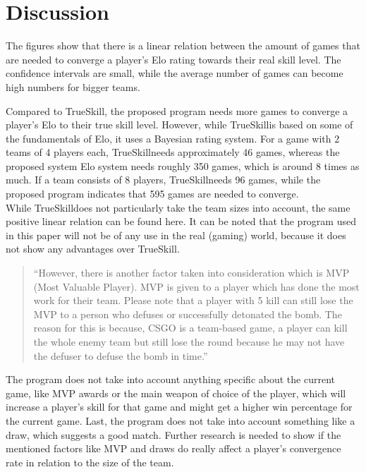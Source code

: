 \documentclass[12pt]{article}
\begin{document}
\section{Discussion}
The figures show that there is a linear relation between the amount of games that are needed to converge a player's Elo rating towards their real skill level. The confidence intervals are small, while the average number of games can become high numbers for bigger teams. 

Compared to TrueSkill\texttrademark, the proposed program needs more games to converge a player's Elo to their true skill level. However, while TrueSkill\texttrademark is based on some of the fundamentals of Elo, it uses a Bayesian rating system.\cite{trueskill} For a game with 2 teams of 4 players each, TrueSkill\texttrademark needs approximately 46 games\cite{trueskillconvergence}, whereas the proposed system Elo system needs roughly 350 games, which is around 8 times as much. If a team consists of 8 players, TrueSkill\texttrademark needs 96 games, while the proposed program indicates that 595 games are needed to converge.\\
While TrueSkill\texttrademark does not particularly take the team sizes into account, the same positive linear relation can be found here. It can be noted that the program used in this paper will not be of any use in the real (gaming) world, because it does not show any advantages over TrueSkill\texttrademark.


\begin{quote}
	``However, there is another factor taken into consideration which is MVP (Most Valuable Player). MVP is given to a player which has done the most work for their team. Please note that a player with 5 kill can still lose the MVP to a person who defuses or successfully detonated the bomb. The reason for this is because, CSGO is a team-based game, a player can kill the whole enemy team but still lose the round because he may not have the defuser to defuse the bomb in time.''\cite{csgo}
\end{quote}

The program does not take into account anything specific about the current game, like MVP awards or the main weapon of choice of the player, which will increase a player's skill for that game and might get a higher win percentage for the current game. Last, the program does not take into account something like a draw, which suggests a good match\cite{trueskillconvergence}. Further research is needed to show if the mentioned factors like MVP and draws do really affect a player's convergence rate in relation to the size of the team.
\end{document}
